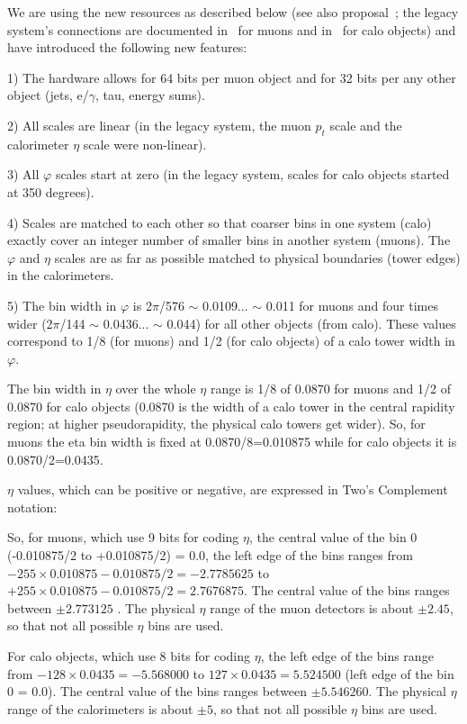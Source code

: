 \documentclass{cmspaper}
\begin{document}
We are using the new resources as described below (see also proposal~\cite{Darin}; the legacy system's connections are documented in~\cite{muon} for muons and in~\cite{calo} for calo objects) and have introduced the following new features:

1) The hardware  allows for 64 bits per muon object and for 32 bits per any other object (jets, e/$\gamma$, tau, energy sums).

2) All scales are linear (in the legacy system, the muon $p_t$ scale and the calorimeter $\eta$ scale were non-linear).

3) All $\varphi$ scales start at zero (in the legacy system, scales for calo objects started at 350 degrees).

4) Scales are matched to each other so that coarser bins in one system (calo) exactly cover an integer number of smaller bins in another system (muons). The $\varphi$ and $\eta$ scales are as far as possible matched to physical boundaries (tower edges) in the calorimeters.

5) The bin width in  $\varphi$  is 2$\pi$/576 $\sim$ 0.0109... $\sim$ 0.011 for muons and four times wider (2$\pi$/144 $\sim$ 0.0436... $\sim$ 0.044) for all other objects (from calo). These values correspond to 1/8 (for muons) and 1/2 (for calo objects) of a calo tower width in $\varphi$.

The bin width in $\eta$ over the whole $\eta$ range is 1/8 of 0.0870 for muons and 1/2 of 0.0870 for calo objects (0.0870 is the width of a calo tower  in the central rapidity region; at higher pseudorapidity, the physical calo towers get wider). So, for muons the eta bin width is fixed at 0.0870/8=0.010875 while for calo objects it is 0.0870/2=0.0435.

$\eta$ values, which can be positive or negative, are expressed in Two's Complement notation:

So, for muons, which use 9 bits for coding $\eta$, the central value of the bin 0 (-0.010875/2 to +0.010875/2) = 0.0, the left edge of the bins ranges from $-255 \times 0.010875 - 0.010875/2 = -2.7785625$ to $+255 \times 0.010875 - 0.010875/2 = 2.7676875$. The central value of the bins ranges between $\pm 2.773125$ .  The physical $\eta$ range of the muon detectors is about $\pm2.45$, so that not all possible $\eta$ bins are used.

For calo objects, which use 8 bits for coding $\eta$, the left edge of the bins range from $-128 \times 0.0435 = -5.568000$ to $127 \times 0.0435 = 5.524500$ (left edge of the bin 0 = 0.0). The central value of the bins ranges between $\pm 5.546260$. The physical $\eta$ range of the calorimeters is about $\pm5$, so that not all possible $\eta$ bins are used.
\end{document}
